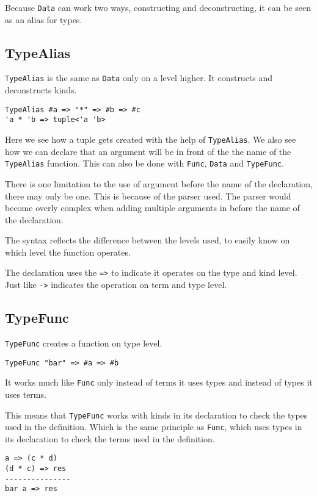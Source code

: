 Because \verb|Data| can work two ways, constructing and deconstructing, it can be seen as an alias for types.

\subsection{TypeAlias}
\verb|TypeAlias| is the same as \verb|Data| only on a level higher.
It constructs and deconstructs kinds.

\begin{lstlisting}
TypeAlias #a => "*" => #b => #c
'a * 'b => tuple<'a 'b>
\end{lstlisting}

Here we see how a tuple gets created with the help of \verb|TypeAlias|.
We also see how we can declare that an argument will be in front of the the name of the \verb|TypeAlias| function.
This can also be done with \verb|Func|, \verb|Data| and \verb|TypeFunc|.

There is one limitation to the use of argument before the name of the declaration, there may only be one.
This is because of the parser used.
The parser would become overly complex when adding multiple arguments in before the name of the declaration.


The syntax reflects the difference between the levels used, to easily know on which level the function operates.

The declaration uses the \verb|=>| to indicate it operates on the type and kind level.
Just like \verb|->| indicates the operation on term and type level.

\subsection{TypeFunc}
\verb|TypeFunc| creates a function on type level.

\begin{lstlisting}
TypeFunc "bar" => #a => #b
\end{lstlisting}

It works much like \verb|Func| only instead of terms it uses types and instead of types it uses terms.

This means that \verb|TypeFunc| works with kinds in its declaration to check the types used in the definition.
Which is the same principle as \verb|Func|, which uses types in its declaration to check the terms used in the definition.

\begin{lstlisting}
a => (c * d)
(d * c) => res
---------------
bar a => res
\end{lstlisting}

